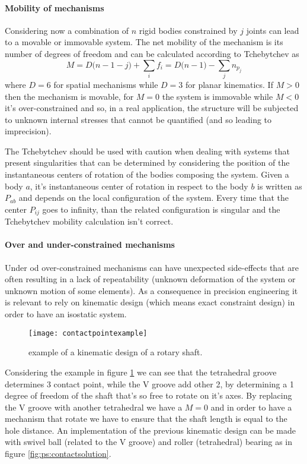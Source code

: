 	\paragraph{Mobility of mechanisms} Considering now  a combination of $n$ rigid bodies constrained by $j$ joints can lead to a movable or immovable system. The net mobility of the mechanism is its number of degrees of freedom and can be calculated according to Tchebytchev as
	\begin{equation} \label{eq:ps:mobility}
		M = D\big(n-1-j\big) +\sum_i f_i = D\big(n-1\big) -\sum_j n_{p_j}
	\end{equation}
	where $D= 6$ for spatial mechanisms while $D= 3$ for planar kinematics. If $M>0$ then the mechanism is movable, for $M = 0$ the system is immovable while $M < 0$ it's over-constrained and so, in a real application, the structure will be subjected to unknown internal stresses that cannot be quantified (and so leading to imprecision).
	
	The Tchebytchev should be used with caution when dealing with systems that present singularities that can be determined by considering the position of the instantaneous centers of rotation of the bodies composing the system. Given a body $a$, it's instantaneous center of rotation in respect to the body $b$ is written as $P_{ab}$ and depends on the local configuration of the system. Every time that the center $P_{ij}$ goes to infinity, than the related configuration is singular and the Tchebytchev mobility calculation isn't correct.
	
	\paragraph{Over and under-constrained mechanisms} Under od over-constrained mechanisms can have unexpected side-effects that are often resulting in a lack of repeatability (unknown deformation of the system or unknown motion of some elements). As a consequence in precision engineering it is relevant to rely on kinematic design (which means exact constraint design) in order to have an isostatic system.
	
	\begin{figure}[bht]
		\centering
		\texttt{[image: contactpointexample]}
		\caption{example of a kinematic design of a rotary shaft.}
		\label{fig:ps:contactpointexample}
	\end{figure}

	Considering the example in figure \ref{fig:ps:contactpointexample} we can see that the tetrahedral groove determines 3 contact point, while the V groove add other 2, by determining a 1 degree of freedom of the shaft that's so free to rotate on it's axes. By replacing the V groove with another tetrahedral we have a $M=0$ and in order to have a mechanism that rotate we have to ensure that the shaft length is equal to the hole distance. An implementation of the previous kinematic design can be made with swivel ball (related to the V groove) and roller (tetrahedral) bearing as in figure \ref{fig:ps:contactsolution}.
	
